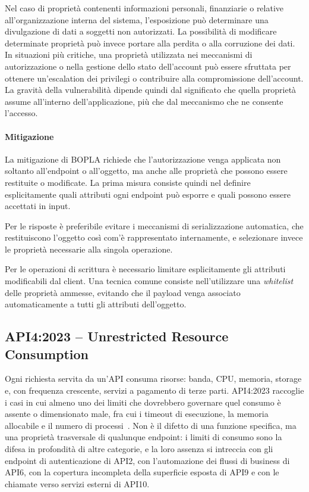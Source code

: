Nel caso di proprietà contenenti informazioni personali, finanziarie o relative all'organizzazione interna del sistema, l'esposizione può determinare una divulgazione di dati a soggetti non autorizzati. La possibilità di modificare determinate proprietà può invece portare alla perdita o alla corruzione dei dati. In situazioni più critiche, una proprietà utilizzata nei meccanismi di autorizzazione o nella gestione dello stato dell'account può essere sfruttata per ottenere un'escalation dei privilegi o contribuire alla compromissione dell'account. La gravità della vulnerabilità dipende quindi dal significato che quella proprietà assume all'interno dell'applicazione, più che dal meccanismo che ne consente l'accesso.

\paragraph{Mitigazione}

La mitigazione di BOPLA richiede che l'autorizzazione venga applicata non soltanto all'endpoint o all'oggetto, ma anche alle proprietà che possono essere restituite o modificate. La prima misura consiste quindi nel definire esplicitamente quali attributi ogni endpoint può esporre e quali possono essere accettati in input.

Per le risposte è preferibile evitare i meccanismi di serializzazione automatica, che restituiscono l'oggetto così com'è rappresentato internamente, e selezionare invece le proprietà necessarie alla singola operazione.

Per le operazioni di scrittura è necessario limitare esplicitamente gli attributi modificabili dal client. Una tecnica comune consiste nell'utilizzare una \textit{whitelist} delle proprietà ammesse, evitando che il payload venga associato automaticamente a tutti gli attributi dell'oggetto.

\subsection{API4:2023 -- Unrestricted Resource Consumption}
\label{subsubsec:api4}

Ogni richiesta servita da un'API consuma risorse: banda, CPU, memoria, storage
e, con frequenza crescente, servizi a pagamento di terze parti. API4:2023
raccoglie i casi in cui almeno uno dei limiti che dovrebbero governare quel
consumo è assente o dimensionato male, fra cui i timeout di esecuzione, la
memoria allocabile e il numero di processi~\cite{owasp2023api4}. Non è il
difetto di una funzione specifica, ma una proprietà trasversale di qualunque
endpoint: i limiti di consumo sono la difesa in profondità di altre categorie,
e la loro assenza si intreccia con gli endpoint di autenticazione di API2, con
l'automazione dei flussi di business di API6, con la copertura incompleta della
superficie esposta di API9 e con le chiamate verso servizi esterni di API10.

